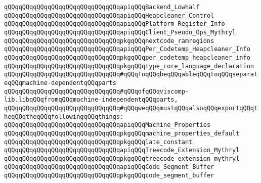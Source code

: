 \verb|qQQqqQQqqQQqqQQqqQQqqQQqqQQqqQQqapiqQQqBackend_Lowhalf|\newline
\verb|qQQqqQQqqQQqqQQqqQQqqQQqqQQqqQQqapiqQQqHeapcleaner_Control|\newline
\verb|qQQqqQQqqQQqqQQqqQQqqQQqqQQqqQQqapiqQQqPlatform_Register_Info|\newline
\verb|qQQqqQQqqQQqqQQqqQQqqQQqqQQqqQQqapiqQQqClient_Pseudo_Ops_Mythryl|\newline
\newline
\verb|qQQqqQQqqQQqqQQqqQQqqQQqqQQqqQQqpkgqQQqnextcode_ramregions|\newline
\newline
\verb|qQQqqQQqqQQqqQQqqQQqqQQqqQQqqQQqapiqQQqPer_Codetemp_Heapcleaner_Info|\newline
\verb|qQQqqQQqqQQqqQQqqQQqqQQqqQQqqQQqpkgqQQqper_codetemp_heapcleaner_info|\newline
\newline
\verb|qQQqqQQqqQQqqQQqqQQqqQQqqQQqqQQqpkgqQQqtype_core_language_declaration|\newline
\newline
\verb|qQQqqQQqqQQqqQQqqQQqqQQqqQQqqQQq#qQQqToqQQqbeqQQqableqQQqtoqQQqseparateqQQqmachine-dependentqQQqparts|\newline
\verb|qQQqqQQqqQQqqQQqqQQqqQQqqQQqqQQq#qQQqofqQQqviscomp-lib.libqQQqfromqQQqmachine-independentqQQqparts,|\newline
\verb|qQQqqQQqqQQqqQQqqQQqqQQqqQQqqQQq#qQQqweqQQqmustqQQqalsoqQQqexportqQQqtheqQQqtheqQQqfollowingqQQqthings:|\newline
\newline
\newline
\verb|qQQqqQQqqQQqqQQqqQQqqQQqqQQqqQQqapiqQQqMachine_Properties|\newline
\newline
\verb|qQQqqQQqqQQqqQQqqQQqqQQqqQQqqQQqpkgqQQqmachine_properties_default|\newline
\verb|qQQqqQQqqQQqqQQqqQQqqQQqqQQqqQQqpkgqQQqlate_constant|\newline
\newline
\verb|qQQqqQQqqQQqqQQqqQQqqQQqqQQqqQQqapiqQQqTreecode_Extension_Mythryl|\newline
\verb|qQQqqQQqqQQqqQQqqQQqqQQqqQQqqQQqpkgqQQqtreecode_extension_mythryl|\newline
\newline
\verb|qQQqqQQqqQQqqQQqqQQqqQQqqQQqqQQqapiqQQqCode_Segment_Buffer|\newline
\verb|qQQqqQQqqQQqqQQqqQQqqQQqqQQqqQQqpkgqQQqcode_segment_buffer|\newline
